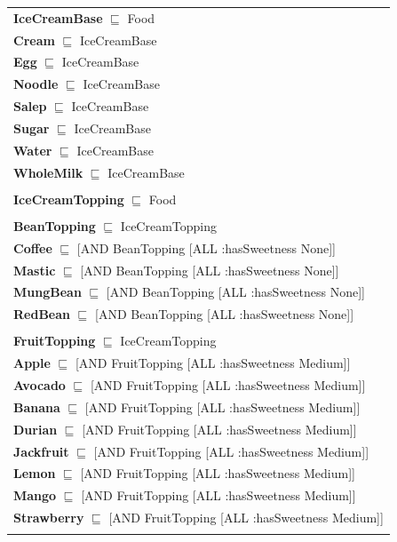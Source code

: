 \documentclass[12pt]{article}
\begin{document}
\begin{tabularx}{1\textwidth}{@{}X@{}}
            
            \textbf{IceCreamBase} $\sqsubseteq$ Food \\
            \textbf{Cream} $\sqsubseteq$ IceCreamBase \\
            \textbf{Egg} $\sqsubseteq$ IceCreamBase \\
            \textbf{Noodle} $\sqsubseteq$ IceCreamBase \\
            \textbf{Salep} $\sqsubseteq$ IceCreamBase \\
            \textbf{Sugar} $\sqsubseteq$ IceCreamBase \\
            \textbf{Water} $\sqsubseteq$ IceCreamBase \\
            \textbf{WholeMilk} $\sqsubseteq$ IceCreamBase \\ \tabularnewline
            
            \textbf{IceCreamTopping} $\sqsubseteq$ Food \\ \tabularnewline
            
            \textbf{BeanTopping} $\sqsubseteq$ IceCreamTopping \\
            \textbf{Coffee} $\sqsubseteq$ [AND BeanTopping [ALL :hasSweetness None]] \\
            \textbf{Mastic} $\sqsubseteq$ [AND BeanTopping [ALL :hasSweetness None]] \\
            \textbf{MungBean} $\sqsubseteq$ [AND BeanTopping [ALL :hasSweetness None]] \\
            \textbf{RedBean} $\sqsubseteq$ [AND BeanTopping [ALL :hasSweetness None]] \\ \tabularnewline
            
            \textbf{FruitTopping} $\sqsubseteq$ IceCreamTopping \\
            \textbf{Apple} $\sqsubseteq$ [AND FruitTopping [ALL :hasSweetness Medium]] \\
            \textbf{Avocado} $\sqsubseteq$ [AND FruitTopping [ALL :hasSweetness Medium]] \\
            \textbf{Banana} $\sqsubseteq$ [AND FruitTopping [ALL :hasSweetness Medium]] \\
            \textbf{Durian} $\sqsubseteq$ [AND FruitTopping [ALL :hasSweetness Medium]] \\
            \textbf{Jackfruit} $\sqsubseteq$ [AND FruitTopping [ALL :hasSweetness Medium]] \\
            \textbf{Lemon} $\sqsubseteq$ [AND FruitTopping [ALL :hasSweetness Medium]] \\
            \textbf{Mango} $\sqsubseteq$ [AND FruitTopping [ALL :hasSweetness Medium]] \\
            \textbf{Strawberry} $\sqsubseteq$ [AND FruitTopping [ALL :hasSweetness Medium]] \\ \tabularnewline
            

\end{tabularx}
\end{document}
